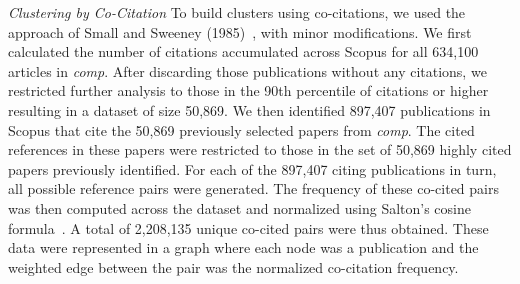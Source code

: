 \emph{Clustering by Co-Citation} To build clusters using co-citations, we used the approach of Small and Sweeney (1985)~\cite{small_clustering_1985}, with minor modifications. We first calculated the number of citations accumulated across Scopus for all 634,100 articles in \emph{comp}. After discarding those publications without any citations, we restricted further analysis to those in the 90th percentile of citations or higher resulting in a dataset of size 50,869. We then identified 897,407 publications in Scopus that cite the 50,869 previously selected papers from \emph{comp}. The cited references in these papers were restricted to those in the set of 50,869 highly cited papers previously identified. For each of the 897,407 citing publications in turn, all possible reference pairs were generated. The frequency of these co-cited pairs was then computed across the dataset  and normalized using Salton's cosine formula~\cite{salton_citation_1979}. A total of 2,208,135 unique co-cited pairs were thus obtained. These data were represented in a graph where each node was a publication and the weighted edge between the pair was the normalized co-citation frequency. \par

